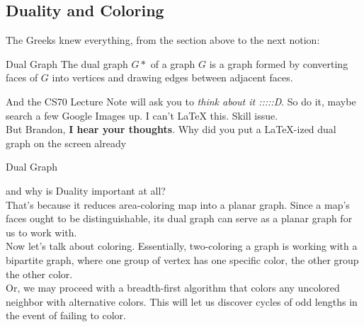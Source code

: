 \subsection{Duality and Coloring}
The Greeks knew everything, from the section above to the next notion:
\begin{ln-define}{Dual Graph}{}
    The dual graph $G*$ of a graph $G$ is a graph formed by converting faces of $G$ into vertices and drawing edges between adjacent faces.
\end{ln-define}
And the CS70 Lecture Note will ask you to \textit{think about it :::::D}. So do it, maybe search a few Google Images up. I can't LaTeX this. Skill issue. \\
But Brandon, \textbf{I hear your thoughts}. Why did you put a LaTeX-ized dual graph on the screen already
\begin{ln-fig}{Dual Graph}{}
    \begin{center}
    \end{center}
\end{ln-fig}
and why is Duality important at all? \\
That's because it reduces area-coloring map into a planar graph. Since a map's faces ought to be distinguishable, its dual graph can serve as a planar graph for us to work with. \\
Now let's talk about coloring. Essentially, two-coloring a graph is working with a bipartite graph, where one group of vertex has one specific color, the other group the other color. \\
Or, we may proceed with a breadth-first algorithm that colors any uncolored neighbor with alternative colors. This will let us discover cycles of odd lengths in the event of failing to color.

